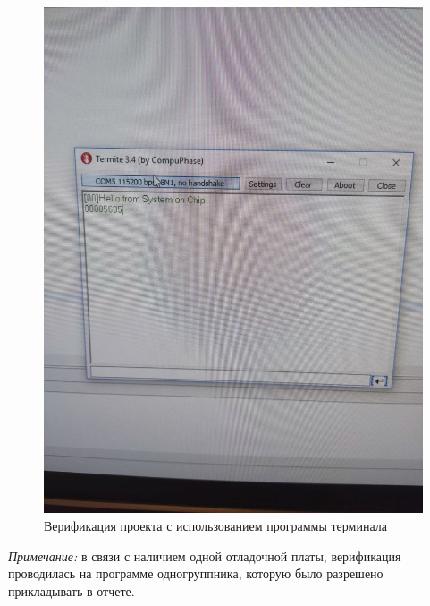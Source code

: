 \begin{figure}[H]
	\begin{center}
		\includegraphics[scale=0.3]{img/result.jpg}
	\end{center}
	\captionsetup{justification=centering}
	\caption{Верификация проекта с использованием программы терминала}
	\label{img:result}
\end{figure}

\textit{Примечание:} в связи с наличием одной отладочной платы, верификация проводилась на программе одногруппника, которую было разрешено прикладывать в отчете.

  


